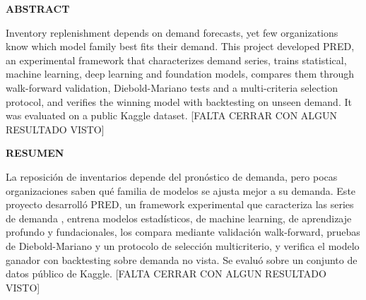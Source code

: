 \begin{center}
    \textbf{ABSTRACT}
\end{center}

\vspace{0.25cm}

Inventory replenishment depends on demand forecasts, yet few organizations know which model family best fits their demand. This project developed PRED, an experimental framework that characterizes demand series, trains statistical, machine learning, deep learning and foundation models, compares them through walk-forward validation, Diebold-Mariano tests and a multi-criteria selection protocol, and verifies the winning model with backtesting on unseen demand. It was evaluated on a public Kaggle dataset. [FALTA CERRAR CON ALGUN RESULTADO VISTO]





\begin{center}
    {\textbf{RESUMEN}}
\end{center}

\vspace{0.25cm}

La reposición de inventarios depende del pronóstico de demanda, pero pocas organizaciones saben qué familia de modelos se ajusta mejor a su demanda. Este proyecto desarrolló PRED, un framework experimental que caracteriza las series de demanda , entrena modelos estadísticos, de machine learning, de aprendizaje profundo y fundacionales, los compara mediante validación walk-forward, pruebas de Diebold-Mariano y un protocolo de selección multicriterio, y verifica el modelo ganador con backtesting sobre demanda no vista. Se evaluó sobre un conjunto de datos público de Kaggle. [FALTA CERRAR CON ALGUN RESULTADO VISTO]